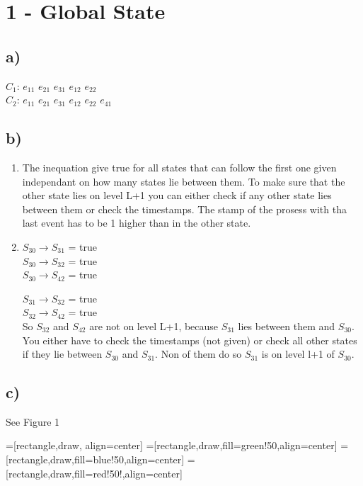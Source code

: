 \documentclass{scrartcl}
\author{Felix Bühler\\2973410 \and Clemens Lieb\\3130838 \and Steffen Wonner\\2862123 \and Fabian Bühler\\2953320}
\title{\gettitle}
\subtitle{\getsubtitle}
\begin{document}
\maketitle

\section*{1 - Global State}
\subsection*{a)}
$C_{1}$: $e_{11}$ $e_{21}$ $e_{31}$ $e_{12}$ $e_{22}$\\
$C_{2}$: $e_{11}$ $e_{21}$ $e_{31}$ $e_{12}$ $e_{22}$ $e_{41}$

\subsection*{b)}
\begin{enumerate}[label=(\roman*)]
\item
The inequation give true for all states that can follow the first one given independant on how many states lie between them. To make sure that the other state lies on level L+1 you can either check if any other state lies between them or check the timestamps. The stamp of the prosess with tha last event has to be 1 higher than in the other state.
\item
$S_{30} \rightarrow S_{31}$ = true\\
$S_{30} \rightarrow S_{32}$ = true\\
$S_{30} \rightarrow S_{42}$ = true

$S_{31} \rightarrow S_{32}$ = true\\
$S_{32} \rightarrow S_{42}$ = true\\

So $S_{32}$ and $S_{42}$ are not on level L+1, because $S_{31}$ lies between them and $S_{30}$.\\
You either have to check the timestamps (not given) or check all other states if they lie between $S_{30}$ and $S_{31}$. Non of them do so $S_{31}$ is on level l+1 of $S_{30}$.
\end{enumerate}
\subsection*{c)} See Figure 1

=[rectangle,draw, align=center]
=[rectangle,draw,fill=green!50,align=center]
=[rectangle,draw,fill=blue!50,align=center]
=[rectangle,draw,fill=red!50!,align=center]
\end{document}
